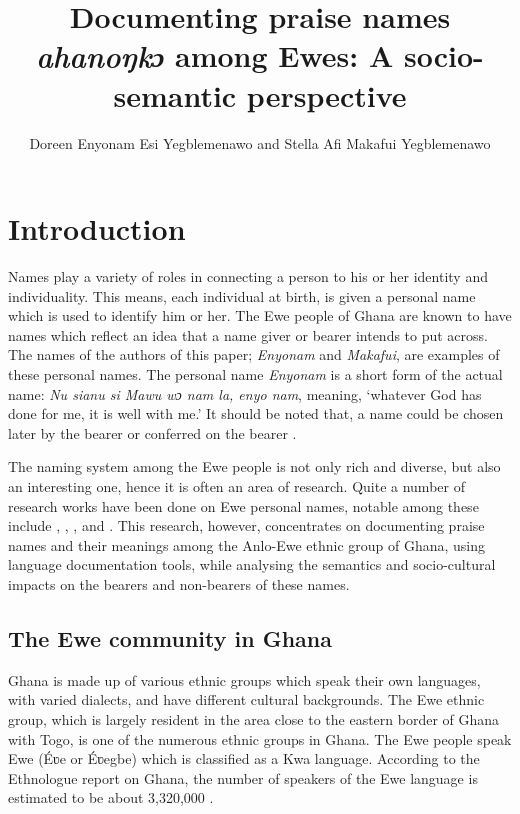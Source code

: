 \documentclass[output=paper]{langscibook}
\author{Doreen Enyonam Esi Yegblemenawo\affiliation{Department of French Education, University of Education, Winneba, Ghana} and Stella Afi Makafui Yegblemenawo\affiliation{Department of Language and Communication Sciences, Kwame Nkrumah University of Science and Technology, Kumasi, Ghana}}
\title[Documenting praise names \textit{ahanoŋkɔ} among Ewes]{Documenting praise names \textit{ahanoŋkɔ} among Ewes: A socio-semantic perspective}
\begin{document}
\maketitle

\section{Introduction}
Names play a variety of roles in connecting a person to his or her identity and individuality. This means, each individual at birth, is given a personal name which is used to identify him or her. The Ewe people of Ghana are known to have names which reflect an idea that a name giver or bearer intends to put across. The names of the authors of this paper; {\textit{Enyonam}} and {\textit{Makafui}}, are examples of these personal names. The personal name \textit{Enyonam} is a short form of the actual name: {\textit{Nu sianu si Mawu wɔ nam la, enyo nam}}, meaning, ‘whatever God has done for me, it is well with me.’ It should be noted that, a name could be chosen later by the bearer or conferred on the bearer \citet{adjah2011name}.

The naming system among the Ewe people is not only rich and diverse, but also an interesting one, hence it is often an area of research. Quite a number of research works have been done on Ewe personal names, notable among these include \citet{Egblewogbe1977Ewe}, \citet{egblewogbe1984personal}, \citet{Atakpa1997}, \citet{adjah2011name} and \citet{abdul2014synchronic}. This research, however, concentrates on documenting praise names and their meanings among the Anlo-Ewe ethnic group of Ghana, using language documentation tools, while analysing the semantics and socio-cultural impacts on the bearers and non-bearers of these names. 
 
\subsection{The Ewe community in Ghana}
Ghana is made up of various ethnic groups which speak their own languages, with varied dialects, and have different cultural backgrounds. The Ewe ethnic group, which is largely resident in the area close to the eastern border of Ghana with Togo, is one of the numerous ethnic groups in Ghana.  The Ewe people speak Ewe (Éʋe or Éʋegbe) which is classified as a Kwa language. According to the Ethnologue report on Ghana, the number of speakers of the Ewe language is estimated to be about 3,320,000 \citep{Eberhard2020}. 
\end{document}
